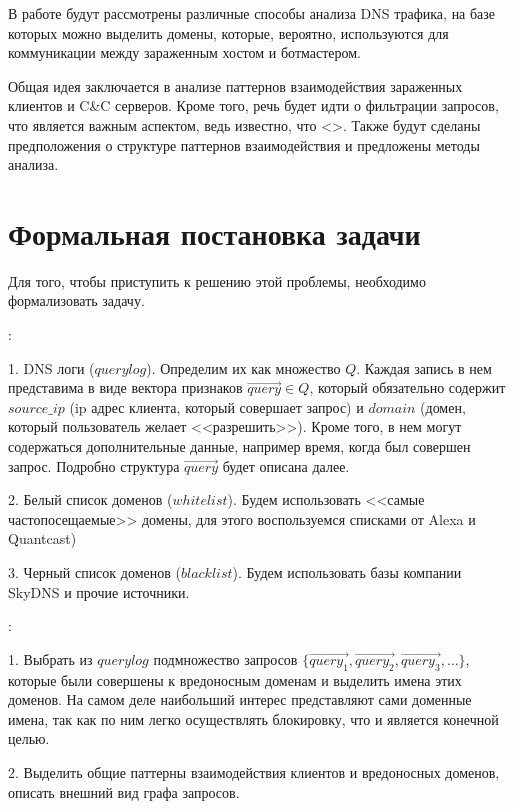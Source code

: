 \documentclass[a4paper,14pt]{extreport} %
\begin{document}
В работе будут рассмотрены различные способы анализа DNS трафика, на базе которых можно выделить домены, которые, вероятно, используются для коммуникации между зараженным хостом и ботмастером.

Общая идея заключается в анализе паттернов взаимодействия зараженных клиентов и C\&C серверов. Кроме того, речь будет идти о фильтрации запросов, что является важным аспектом, ведь известно, что <>. Также будут сделаны предположения о структуре паттернов взаимодействия и предложены методы анализа.

\chapter{Формальная постановка задачи}
Для того, чтобы приступить к решению этой проблемы, необходимо формализовать задачу.

{:}
		
1. DNS логи ($querylog$). Определим их как множество $Q$. Каждая запись в нем представима в виде вектора признаков $\vec{query}$$\in$$Q$, который обязательно содержит $source\_ip$ (ip адрес клиента, который совершает запрос) и $domain$ (домен, который пользователь желает <<разрешить>>). Кроме того, в нем могут содержаться дополнительные данные, например время, когда был совершен запрос. Подробно структура $\vec{query}$ будет описана далее.
		
2. Белый список доменов ($whitelist$). Будем использовать <<самые частопосещаемые>> домены, для этого воспользуемся списками от Alexa и Quantcast)
		
3. Черный список доменов ($blacklist$). Будем использовать базы компании SkyDNS и прочие источники.
	
{:} 
	
1. Выбрать из $querylog$ подмножество 
запросов $\{\vec{query_1}, \vec{query_2}, \vec{query_3}, \dots\}$, которые были совершены к вредоносным доменам и выделить имена этих доменов. На самом деле наибольший интерес представляют сами доменные имена, так как по ним легко осуществлять блокировку, что и является конечной целью.
	
2. Выделить общие паттерны взаимодействия клиентов и вредоносных доменов, описать внешний вид графа запросов.

\newpage
\end{document}
